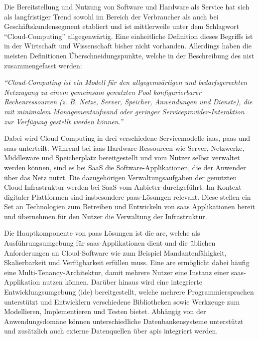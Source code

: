 Die Bereitstellung und Nutzung von Software und Hardware als Service hat sich als langfristiger Trend sowohl im Bereich der Verbraucher als auch bei Geschäftskundensegment etabliert und ist mittlerweile unter dem Schlagwort \enquote{Cloud-Computing} allgegenwärtig. Eine einheitliche Definition dieses Begriffs ist in der Wirtschaft und Wissenschaft bisher nicht vorhanden. Allerdings haben die meisten Definitionen Überschneidungspunkte, welche in der Beschreibung des \ac{nist} zusammengefasst werden: 

\begin{center}
    \textit{\enquote{Cloud-Computing ist ein Modell für den allgegenwärtigen und bedarfsgerechten Netzzugang zu einem gemeinsam genutzten Pool konfigurierbarer Rechenressourcen (z. B. Netze, Server, Speicher, Anwendungen und Dienste), die mit minimalem Managementaufwand oder geringer Serviceprovider-Interaktion zur Verfügung gestellt werden können.}} \autocite[S. 2]{MELL2011}
\end{center}

Dabei wird Cloud Computing in drei verschiedene Servicemodelle \ac{iaas}, \ac{paas} und \ac{saas} unterteilt. Während bei \ac{iaas} Hardware-Ressourcen wie Server, Netzwerke, Middleware und Speicherplatz bereitgestellt und vom Nutzer selbst verwaltet werden können, sind es bei SaaS die Software-Applikationen, die der Anwender über das Netz nutzt. Die dazugehörigen Verwaltungsaufgaben der genutzten Cloud Infrastruktur werden bei SaaS vom Anbieter durchgeführt. Im Kontext digitaler Plattformen sind insbesondere \ac{paas}-Lösungen relevant.\autocite[Vgl.][S. 2f]{MELL2011} Diese stellen ein Set an Technologien zum Betreiben und Entwickeln von \ac{saas} Applikationen bereit und übernehmen für den Nutzer die Verwaltung der Infrastruktur.\autocite[Vgl.][S. 8]{BRAUNINGER2012}

Die Hauptkomponente von \ac{paas} Lösungen ist die \ac{are}, welche als Ausführungsumgebung für \ac{saas}-Applikationen dient und die üblichen Anforderungen an Cloud-Software wie zum Beispiel Mandantenfähigkeit, Skalierbarkeit und Verfügbarkeit erfüllen muss. Eine \ac{are} ermöglicht dabei häufig eine Multi-Tenancy-Architektur, damit mehrere Nutzer eine Instanz einer \ac{saas}-Applikation nutzen können. Darüber hinaus wird eine integrierte Entwicklungsumgebung (\acs{ide}) bereitgestellt, welche mehrere Programmiersprachen unterstützt und Entwicklern verschiedene Bibliotheken sowie Werkzeuge zum Modellieren, Implementieren und Testen bietet. Abhängig von der Anwendungsdomäne können unterschiedliche Datenbankensysteme unterstützt und zusätzlich auch externe Datenquellen über \acp{api} integriert werden. \autocite[Vgl.][S. 371]{BEIMBORN2011}

